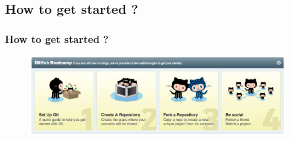 \documentclass{beamer}
\begin{document}
\subsection{How to get started ?}
\begin{frame}
\frametitle{How to get started ?}
\begin{figure}
\includegraphics[width=1.1\linewidth]{original}
\end{figure}
\end{frame}
\end{document}
